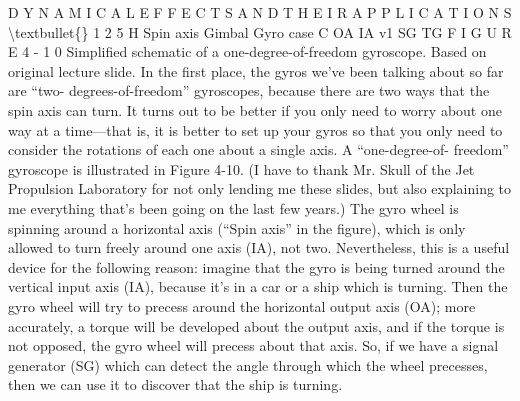 \documentclass[10pt,oneside]{article}
\begin{document}
D Y N A M I C A L  E F F E C T S  A N D  T H E I R  A P P L I C A T I O N S \textbackslash{}textbullet\{\} 1 2 5 H Spin axis Gimbal Gyro case C OA IA v1 SG TG F I G U R E  4 - 1 0 Simplified schematic of a one-degree-of-freedom gyroscope. Based on original lecture slide. In the first place, the gyros we’ve been talking about so far are “two- degrees-of-freedom” gyroscopes, because there are two ways that the spin axis can turn. It turns out to be better if you only need to worry about one way at a time---that is, it is better to set up your gyros so that you only need to consider the rotations of each one about a single axis. A “one-degree-of- freedom” gyroscope is illustrated in Figure 4-10. (I have to thank Mr. Skull of the Jet Propulsion Laboratory for not only lending me these slides, but also explaining to me everything that’s been going on the last few years.) The gyro wheel is spinning around a horizontal axis (“Spin axis” in the figure), which is only allowed to turn freely around one axis (IA), not two. Nevertheless, this is a useful device for the following reason: imagine that the gyro is being turned around the vertical input axis (IA), because it’s in a car or a ship which is turning. Then the gyro wheel will try to precess around the horizontal output axis (OA); more accurately, a torque will be developed about the output axis, and if the torque is not opposed, the gyro wheel will precess about that axis. So, if we have a signal generator (SG) which can detect the angle through which the wheel precesses, then we can use it to discover that the ship is turning.\par
\end{document}
